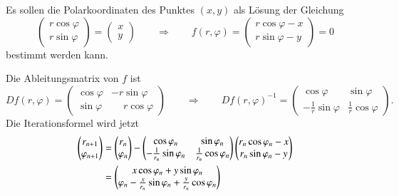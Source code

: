 \begin{beispiel}
Es sollen die Polarkoordinaten des Punktes $(x,y)$
als Lösung der Gleichung
\[
\begin{pmatrix}
r\cos\varphi\\r\sin\varphi
\end{pmatrix}
=
\begin{pmatrix}x\\y\end{pmatrix}
\qquad\Rightarrow\qquad
f(r,\varphi) =\begin{pmatrix}r\cos\varphi -x \\ r\sin\varphi -y \end{pmatrix}
=0
\]
bestimmt werden kann.

Die Ableitungsmatrix von $f$ ist
\[
Df(r,\varphi)
=
\begin{pmatrix}
\cos\varphi&-r \sin\varphi\\
\sin\varphi&\phantom{-} r \cos\varphi
\end{pmatrix}
\qquad\Rightarrow\qquad
Df(r,\varphi)^{-1}
=
\begin{pmatrix}
\cos\varphi&\sin\varphi\\
-\frac1r\sin\varphi&\frac1r\cos\varphi
\end{pmatrix}.
\]
Die Iterationsformel wird jetzt
\begin{align}
\begin{pmatrix}
r_{n+1}\\
\varphi_{n+1}
\end{pmatrix}
&=
\begin{pmatrix}r_n\\\varphi_n\end{pmatrix}
-
\begin{pmatrix}
\cos\varphi_n&\sin\varphi_n\\
-\frac1{r_n}\sin\varphi_n&\frac1{r_n}\cos\varphi_n
\end{pmatrix}
\begin{pmatrix}
r_n\cos\varphi_n-x\\
r_n\sin\varphi_n-y
\end{pmatrix}
\notag
\\
&=
\begin{pmatrix}
x\cos\varphi_n+y\sin\varphi_n\\
\varphi_n -\frac{x}{r_n}\sin\varphi_n+\frac{y}{r_n}\cos\varphi_n
\end{pmatrix}
\label{buch:equation:polar}
\end{align}
\begin{table}
\centering
\begin{tabular}{|>{$}r<{$}|>{$}r<{$}>{$}r<{$}|}

\end{tabular}
\end{table}
\end{beispiel}
